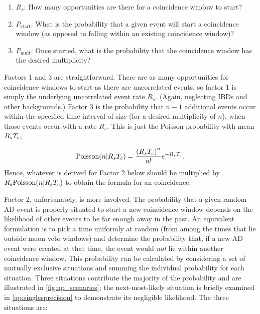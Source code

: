 \begin{enumerate}
    \item $R_s$: How many opportunities are there for a coincidence window to start?
    \item $P_{\text{start}}$: What is the probability that a given event will start a
        coincidence window (as opposed to falling within
        an existing coincidence window)?
    \item $P_{\text{mult}}$: Once started, what is the probability
        that the coincidence window has the desired multiplicity?
\end{enumerate}

Factors 1 and 3 are straightforward.
There are as many opportunities for coincidence windows to start
as there are uncorrelated events, so factor 1 is simply
the underlying uncorrelated event rate $R_s$.
(Again, neglecting IBDs and other backgrounds.)
Factor 3 is the probability that $n-1$ additional events occur
within the specified time interval of size \tc{}
(for a desired multiplicity of $n$), when those events occur with a rate $R_s$.
This is just the Poisson probability with mean $R_sT_c$:

\begin{equation}
    \text{Poisson}(n\vert R_sT_c) = \frac{\left(R_sT_c\right)^n}{n!}e^{-R_sT_c}.
\end{equation}
Hence, whatever is derived for Factor 2 below should be multiplied by
$R_s\text{Poisson}(n\vert R_sT_c)$ to obtain the formula for
an  coincidence.

Factor 2, unfortunately, is more involved.
The probability that a given random AD event
is properly situated to start a new coincidence window depends on
the likelihood of other events to be far enough away in the past.
An equivalent formulation is to pick a time uniformly at random
(from among the times that lie outside muon veto windows)
and determine the probability that, if a new AD event were created
at that time, the event would \textit{not} lie within another
coincidence window.
This probability can be calculated by considering
a set of mutually exclusive situations
and summing the individual probability for each situation.
Three situations contribute the majority of the probability
and are illustrated in \cref{fig:ap_scenarios};
the next-most-likely situation is briefly examined in \cref{ap:singlesprecision}
to demonstrate its negligible likelihood.
The three situations are:

